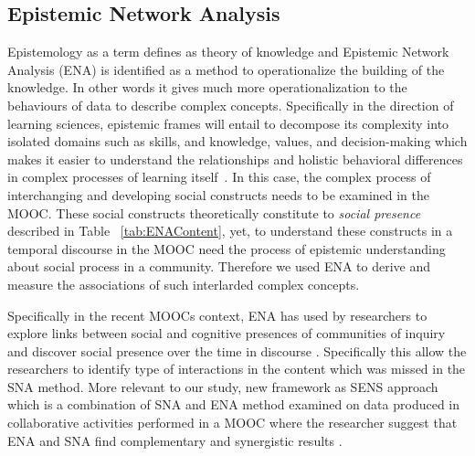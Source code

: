 \documentclass[manuscript,screen,review]{acmart}
\begin{document}
\subsection{Epistemic Network Analysis}
Epistemology as a term defines as theory of knowledge and Epistemic Network Analysis (ENA) is identified as a method to operationalize the building of the knowledge. In other words it gives much more operationalization to the behaviours of data to describe complex concepts. Specifically in the direction of learning sciences, epistemic frames will entail to decompose its complexity into isolated domains such as skills, and knowledge, values, and decision-making which makes it easier to understand the relationships and holistic behavioral differences in complex processes of learning itself~\cite{shaffer2017quantitative, shaffer2009epistemic, rupp2010evidence}. 
In this case, the complex process of interchanging and developing social constructs needs to be examined in the MOOC. These social constructs theoretically constitute to \textit{social presence} described in Table ~\ref{tab:ENAContent}, yet, to understand these constructs in a temporal discourse in the MOOC need the process of epistemic understanding about social process in a community. Therefore we used ENA to derive and measure the associations of such interlarded complex concepts.

Specifically in the recent MOOCs context, ENA has used by researchers to explore links between social and cognitive presences of communities of inquiry and discover social presence over the time in discourse \cite{rolim2019network}. Specifically this allow the researchers to identify type of interactions in the content which was missed in the SNA method. More relevant to our study,  new framework as SENS approach which is a combination of SNA and ENA method examined on data produced in collaborative activities performed in a MOOC where the researcher suggest that ENA and SNA find complementary and synergistic results \cite{gavsevic2019sens}. 
\end{document}
